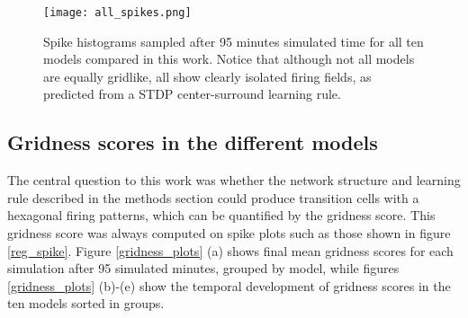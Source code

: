 \documentclass{article}
\begin{document}
    \begin{figure}[H]
        \centering
        \texttt{[image: all\_spikes.png]}
        \caption{Spike histograms sampled after 95 minutes simulated time for all ten models compared in this work. Notice that although not all models are equally gridlike, all show clearly isolated firing fields, as predicted from a STDP center-surround learning rule.}
        \label{all_spikes}
    \end{figure}

    \subsection{Gridness scores in the different models} \label{Gscore}
    
    The central question to this work was whether the network structure and learning rule described in the methods section could produce transition cells with a hexagonal firing patterns, which can be quantified by the gridness score. This gridness score was always computed on spike plots such as those shown in figure \ref{reg_spike}. Figure \ref{gridness_plots} (a) shows final mean gridness scores for each simulation after 95 simulated minutes, grouped by model, while figures \ref{gridness_plots} (b)-(e) show the temporal development of gridness scores in the ten models sorted in groups.
    
\end{document}
